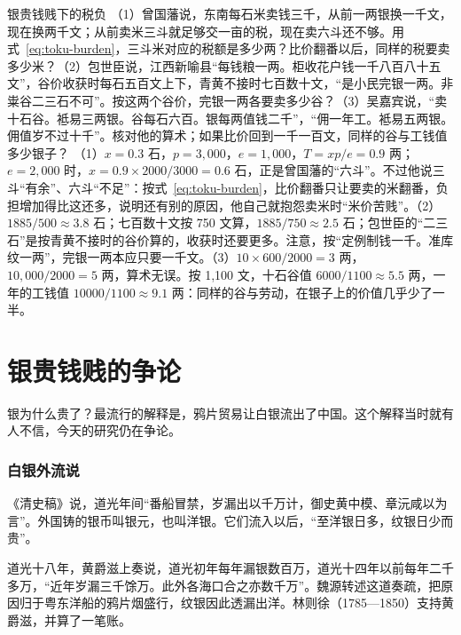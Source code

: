 \begin{example}{银贵钱贱下的税负}\label{ex:toku-burden}
（1）曾国藩说，东南每石米卖钱三千，从前一两银换一千文，现在换两千文；从前卖米三斗就足够交一亩的税，现在卖六斗还不够\cite{xubiansheng}。用式~\eqref{eq:toku-burden}，三斗米对应的税额是多少两？比价翻番以后，同样的税要卖多少米？（2）包世臣说，江西新喻县“每钱粮一两。柜收花户钱一千八百八十五文”，谷价收获时每石五百文上下，青黄不接时七百数十文，“是小民完银一两。非粜谷二三石不可”\cite{xubiansheng}。按这两个谷价，完银一两各要卖多少谷？（3）吴嘉宾说，“卖十石谷。袛易三两银。谷每石六百。银每两值钱二千”，“佣一年工。袛易五两银。佣值岁不过十千”\cite{xubiansheng}。核对他的算术；如果比价回到一千一百文，同样的谷与工钱值多少银子？
\solution （1）$x=0.3$ 石，$p=3{,}000$，$e=1{,}000$，$T=xp/e=0.9$ 两；$e=2{,}000$ 时，$x=0.9\times2000/3000=0.6$ 石，正是曾国藩的“六斗”。不过他说三斗“有余”、六斗“不足”：按式~\eqref{eq:toku-burden}，比价翻番只让要卖的米翻番，负担增加得比这还多，说明还有别的原因，他自己就抱怨卖米时“米价苦贱”\cite{xubiansheng}。（2）$1885/500\approx3.8$ 石；七百数十文按 750 文算，$1885/750\approx2.5$ 石；包世臣的“二三石”是按青黄不接时的谷价算的，收获时还要更多。注意，按“定例制钱一千。准库纹一两”，完银一两本应只要一千文\cite{xubiansheng}。（3）$10\times600/2000=3$ 两，$10{,}000/2000=5$ 两，算术无误。按 1,100 文，十石谷值 $6000/1100\approx5.5$ 两，一年的工钱值 $10000/1100\approx9.1$ 两：同样的谷与劳动，在银子上的价值几乎少了一半。
\end{example}

\section{银贵钱贱的争论}\label{sec:toku-debate}

银为什么贵了？最流行的解释是，鸦片贸易让白银流出了中国。这个解释当时就有人不信，今天的研究仍在争论。

\subsubsection{白银外流说}
《清史稿》说，道光年间“番船冒禁，岁漏出以千万计，御史黄中模、章沅咸以为言”。外国铸的银币叫银元，也叫洋银。它们流入以后，“至洋银日多，纹银日少而贵”\cite{qingshigao}。

道光十八年，黄爵滋上奏说，道光初年每年漏银数百万，道光十四年以前每年二千多万，“近年岁漏三千馀万。此外各海口合之亦数千万”\cite{qingshigao}。魏源转述这道奏疏，把原因归于粤东洋船的鸦片烟盛行，纹银因此透漏出洋\cite{xubiange}。林则徐（1785—1850）支持黄爵滋，并算了一笔账。

